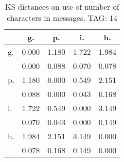 \begin{table}[h!]
\begin{center}
\begin{tabular}{| l | c | c | c | c |}\hline
 & g. & p. & i. & h. \\\hline
g. & 0.000  & 1.180  & 1.722  & 1.984 \\\hline
 & 0.000  & 0.088  & 0.070  & 0.078 \\\hline
p. & 1.180  & 0.000  & 0.549  & 2.151 \\\hline
 & 0.088  & 0.000  & 0.043  & 0.168 \\\hline
i. & 1.722  & 0.549  & 0.000  & 3.149 \\\hline
 & 0.070  & 0.043  & 0.000  & 0.149 \\\hline
h. & 1.984  & 2.151  & 3.149  & 0.000 \\\hline
 & 0.078  & 0.168  & 0.149  & 0.000 \\\hline
\end{tabular}
\caption{KS distances on use of number of characters in messages. TAG: 14}
\end{center}
\end{table}